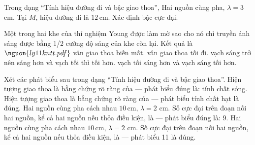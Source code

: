 \begin{ex}
Trong dạng “Tính hiệu đường đi và bậc giao thoa”, Hai nguồn cùng pha, $\lambda=3$ cm. Tại $M$, hiệu đường đi là $12\,\text{cm}$. Xác định bậc cực đại.
\end{ex}

\begin{ex}
Một trong hai khe của thí nghiệm Young được làm mờ sao cho nó chỉ truyền ánh sáng được bằng 1/2 cường độ sáng của khe còn lại. Kết quả là $\nguon{ly11 kntt.pdf}$
\choice
{vân giao thoa biến mất.}
{vân giao thoa tối đi.}
{vạch sáng trở nên sáng hơn và vạch tối thì tối hơn.}
{\True vạch tối sáng hơn và vạch sáng tối hơn.}
\end{ex}

\begin{ex}
Xét các phát biểu sau trong dạng “Tính hiệu đường đi và bậc giao thoa”.
\choiceTF
{\True Hiện tượng giao thoa là bằng chứng rõ ràng của — phát biểu đúng là: tính chất sóng.}
{Hiện tượng giao thoa là bằng chứng rõ ràng của — phát biểu tính chất hạt là đúng.}
{\True Hai nguồn cùng pha cách nhau $10\,\text{cm}$, $\lambda=2$ cm. Số cực đại trên đoạn nối hai nguồn, kể cả hai nguồn nếu thỏa điều kiện, là — phát biểu đúng là: 9.}
{Hai nguồn cùng pha cách nhau $10\,\text{cm}$, $\lambda=2$ cm. Số cực đại trên đoạn nối hai nguồn, kể cả hai nguồn nếu thỏa điều kiện, là — phát biểu 11 là đúng.}
\end{ex}

